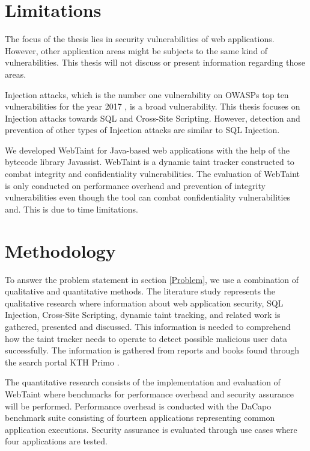 \section{Limitations}
\label{Delimitations}
The focus of the thesis lies in security vulnerabilities of web applications. However, other application areas might be subjects to the same kind of vulnerabilities. This thesis will not discuss or present information regarding those areas. 

Injection attacks, which is the number one vulnerability on OWASPs top ten vulnerabilities for the year 2017 \parencite{OWASP2017}, is a broad vulnerability. This thesis focuses on Injection attacks towards SQL and Cross-Site Scripting. However, detection and prevention of other types of Injection attacks are similar to SQL Injection.

We developed WebTaint for Java-based web applications with the help of the bytecode library Javassist. WebTaint is a dynamic taint tracker constructed to combat integrity and confidentiality vulnerabilities. The evaluation of WebTaint is only conducted on performance overhead and prevention of integrity vulnerabilities even though the tool can combat confidentiality vulnerabilities and. This is due to time limitations.



\section{Methodology}
\label{Methodology}
To answer the problem statement in section \ref{Problem}, we use a combination of qualitative and quantitative methods. The literature study represents the qualitative research where information about web application security, SQL Injection, Cross-Site Scripting, dynamic taint tracking, and related work is gathered, presented and discussed. This information is needed to comprehend how the taint tracker needs to operate to detect possible malicious user data successfully. The information is gathered from reports and books found through the search portal KTH Primo \parencite{primo}.

The quantitative research consists of the implementation and evaluation of WebTaint where benchmarks for performance overhead and security assurance will be performed. Performance overhead is conducted with the DaCapo \parencite{dacapo} benchmark suite consisting of fourteen applications representing common application executions. Security assurance is evaluated through use cases where four applications are tested.



